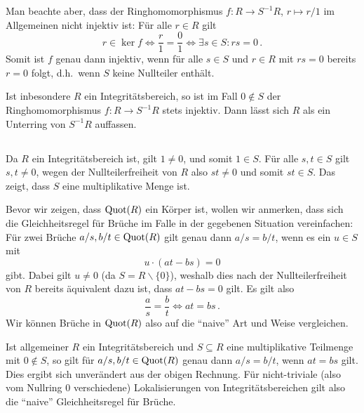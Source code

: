 \begin{remark}
  \label{remark: injectivity of the canonical map}
  Man beachte aber, dass der Ringhomomorphismus $f \colon R \to S^{-1} R$, $r \mapsto r/1$ im Allgemeinen nicht injektiv ist:
  Für alle $r \in R$ gilt
  \[
          r \in \ker f
    \iff  \frac{r}{1} = \frac{0}{1}
    \iff  \exists s \in S: rs = 0 \,.
  \]
  Somit ist $f$ genau dann injektiv, wenn für alle $s \in S$ und $r \in R$ mit $rs = 0$ bereits $r = 0$ folgt, d.h.\ wenn $S$ keine Nullteiler enthält.
  
  Ist inbesondere $R$ ein Integritätsbereich, so ist im Fall $0 \notin S$ der Ringhomomorphismus $f \colon R \to S^{-1} R$ stets injektiv.
  Dann lässt sich $R$ als ein Unterring von $S^{-1} R$ auffassen.
\end{remark}





\subsection{}

Da $R$ ein Integritätsbereich ist, gilt $1 \neq 0$, und somit $1 \in S$.
Für alle $s, t \in S$ gilt $s, t \neq 0$, wegen der Nullteilerfreiheit von $R$ also $st \neq 0$ und somit $st \in S$.
Das zeigt, dass $S$ eine multiplikative Menge ist.

Bevor wir zeigen, dass $\operatorname{Quot}(R)$ ein Körper ist, wollen wir anmerken, dass sich die Gleichheitsregel für Brüche im Falle in der gegebenen Situation vereinfachen:
Für zwei Brüche $a/s, b/t \in \operatorname{Quot}(R)$ gilt genau dann $a/s = b/t$, wenn es ein $u \in S$ mit
\[
    u \cdot (at - bs) = 0
\]
gibt.
Dabei gilt $u \neq 0$ (da $S = R \smallsetminus \{0\}$), weshalb dies nach der Nullteilerfreiheit von $R$ bereits äquivalent dazu ist, dass $at - bs = 0$ gilt.
Es gilt also
\begin{equation}
  \label{equation: comparing fractions over integral domains}
    \frac{a}{s}
  = \frac{b}{t}
  \iff
    at = bs \,.
\end{equation}
Wir können Brüche in $\operatorname{Quot}(R)$ also auf die \enquote{naive} Art und Weise vergleichen.

\begin{remark}
  Ist allgemeiner $R$ ein Integritätsbereich und $S \subseteq R$ eine multiplikative Teilmenge mit $0 \notin S$, so gilt für $a/s, b/t \in \operatorname{Quot}(R)$ genau dann $a/s = b/t$, wenn $at = bs$ gilt.
  Dies ergibt sich unverändert aus der obigen Rechnung.
  Für nicht-triviale (also vom Nullring $0$ verschiedene) Lokalisierungen von Integritätsbereichen gilt also die \enquote{naive} Gleichheitsregel für Brüche.
\end{remark}

